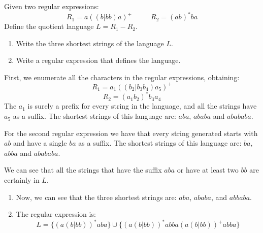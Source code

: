 \documentclass[12pt, a4paper]{report}
\newtheorem[style=M,bodystyle=\normalfont]{theorem}{Theorem}
\newtheorem[style=M,bodystyle=\normalfont]{corollary}{Corollary}
\newtheorem[style=M,bodystyle=\normalfont]{lemma}{Lemma}
\newtheorem[style=M,bodystyle=\normalfont]{definition}{Definition}
\begin{document}
\begin{Exercise}[label=3]
    Given two regular expressions: 
    \[R_1=a((b|bb)a)^{+} \:\:\:\:\:\:\:\:\:\:\:\: R_2=(ab)^{*}ba\]
    Define the quotient language $L=R_1-R_2$. 
    \begin{enumerate}
        \item Write the three shortest strings of the language $L$.
        \item Write a regular expression that defines the language. 
    \end{enumerate}
\end{Exercise}
\begin{Answer}[ref=3]
    First, we enumerate all the characters in the regular expressions, obtaining: 
    \[R_1=a_1((b_2|b_3b_4)a_5)^{+}\]
    \[R_2=(a_1b_2)^{*}b_3a_4\]
    The $a_1$ is surely a prefix for every string in the language, and all the strings have $a_5$ as a suffix. The shortest strings of this language are: $aba$, $ababa$ and $abababa$. 
    
    For the second regular expression we have that every string generated starts with $ab$ and have a single $ba$ as a suffix. The shortest strings of this language are: $ba$, $abba$ and $abababa$. 
    
    We can see that all the strings that have the suffix $aba$ or have at least two $bb$ are certainly in $L$. 

    \begin{enumerate}
        \item Now, we can see that the three shortest strings are: $aba$, $ababa$, and $abbaba$. 
        \item The regular expression is: 
            \[L=\{(a(b|bb))^{*}aba\} \cup \{(a(b|bb))^{*}abba(a(b|bb))^{+}abba\}\]
    \end{enumerate}
\end{Answer}    
\end{document}
